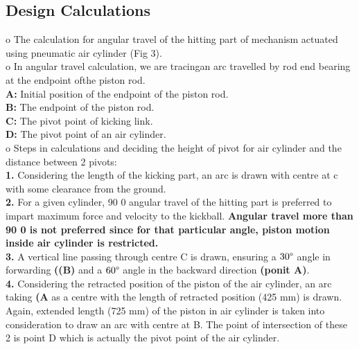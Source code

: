     \subsection{Design Calculations}
        o The calculation for angular travel of the hitting part of mechanism actuated using pneumatic air cylinder (Fig 3).                    \\
        o In angular travel calculation, we are tracingan arc travelled by rod end bearing at the endpoint ofthe piston rod.                    \\
            \textbf{A:} Initial position of the endpoint of the piston rod.                                                                     \\
            \textbf{B:} The endpoint of the piston rod.                                                                                         \\
            \textbf{C:} The pivot point of kicking link.                                                                                        \\
            \textbf{D:} The pivot point of an air cylinder.                                                                                     \\
        o Steps in calculations and deciding the height of pivot for air cylinder and the distance between 2 pivots:                            \\
            \textbf{1.} Considering the length of the kicking part, an arc is drawn with centre at c with some clearance from the ground.    \\
            \textbf{2.} For a given cylinder, 90 0 angular travel of the hitting part is preferred to impart maximum force and velocity 
                        to the kickball. \textbf{Angular travel more than 90 0 is not preferred since for that particular angle, piston 
                        motion inside air cylinder is restricted.}                                                                           \\
            \textbf{3.} A vertical line passing through centre C is drawn, ensuring a $30 \degree$ angle in forwarding \textbf{((B)} and
                        a $60 \degree$ angle in the backward direction \textbf{(ponit A)}.                                                   \\    
            \textbf{4.} Considering the retracted position of the piston of the air cylinder, an arc taking \textbf{(A} as a centre with
                        the length of retracted position (425 mm) is drawn. Again, extended length (725 mm) of the piston in air cylinder
                        is taken into consideration to draw an arc with centre at B. The point of intersection of these 2 is point D which
                        is actually the pivot point of the air cylinder.                                                                     \\
 

